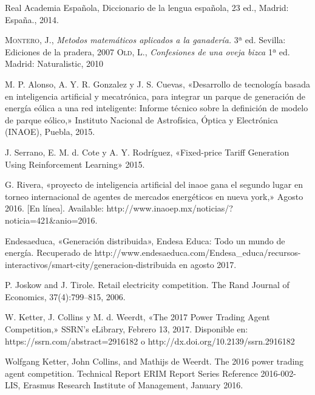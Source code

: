 \renewcommand{\refname}{Bibliografía}
\begin{thebibliography}{a}

	Real Academia Española, Diccionario de la lengua española, 23 ed., Madrid: España., 2014.
	
	 \textsc{Montero, J.}, \textit{Metodos matemáticos aplicados a la ganadería.} 3ª ed. Sevilla: Ediciones de la pradera, 2007  
	 \textsc{Old, L.}, \textit{Confesiones de una oveja bizca} 1ª ed. Madrid: Naturalistic, 2010 

	 M. P. Alonso, A. Y. R. Gonzalez y J. S. Cuevas, «Desarrollo de tecnología basada en inteligencia artificial y mecatrónica, para integrar un parque de generación de energía eólica a una red inteligente: Informe técnico sobre la definición de modelo de parque eólico,» Instituto Nacional de Astrofísica, Óptica y Electrónica (INAOE), Puebla, 2015.
	
	 J. Serrano, E. M. d. Cote y A. Y. Rodríguez, «Fixed-price Tariff Generation Using Reinforcement
Learning» 2015.

	 G. Rivera, «proyecto de inteligencia artificial del inaoe gana el segundo lugar en torneo
internacional de agentes de mercados energéticos en nueva york,» Agosto 2016. [En línea].
Available: http://www.inaoep.mx/noticias/?noticia=421\&anio=2016.

	 Endesaeduca, «Generación distribuida», Endesa Educa: Todo un mundo de energía. 
	Recuperado de http://www.endesaeduca.com/Endesa\_educa/recursos-interactivos/smart-city/generacion-distribuida en agosto 2017.

	 P. Joskow and J. Tirole. Retail electricity competition. The Rand Journal of Economics,
37(4):799–815, 2006.

	 W. Ketter, J. Collins y M. d. Weerdt, «The 2017 Power Trading Agent Competition,» SSRN's eLibrary, Febrero 13, 2017. 
	Disponible en: https://ssrn.com/abstract=2916182 o http://dx.doi.org/10.2139/ssrn.2916182

	 Wolfgang Ketter, John Collins, and Mathijs de Weerdt. The 2016 power trading agent competition. Technical Report ERIM Report Series Reference 2016-002-LIS, Erasmus Research
Institute of Management, January 2016.


\end{thebibliography}
